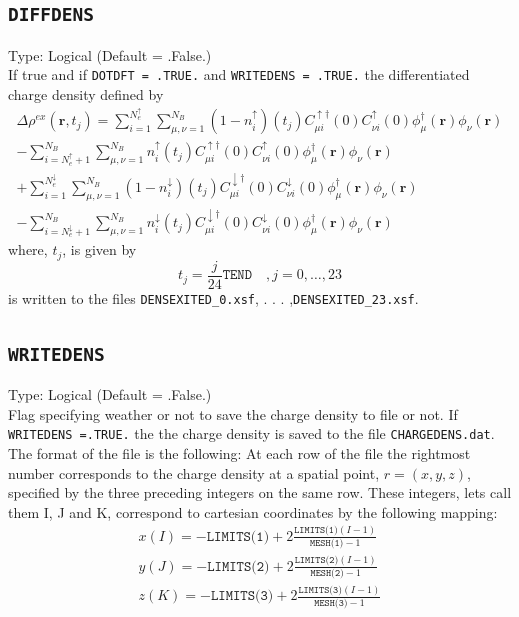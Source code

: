\documentclass[a4paper,twoside,openany]{book}
\begin{document}
{{{{\subsection{\texttt{DIFFDENS}}
Type: Logical (Default = .False.)\\
If true and if \texttt{DOTDFT = .TRUE.} and \texttt{WRITEDENS = .TRUE.}  the differentiated charge density defined by 
\begin{eqnarray}
\Delta \rho^{ex}(\mathbf{r},t_{j}) = \sum_{i=1}^{N_{e}^{\uparrow}}\sum_{\mu,\nu=1}^{N_{B}}(1-n^{\uparrow}_{i})(t_{j})C_{\mu i}^{\uparrow \dagger}(0)C_{\nu i}^{\uparrow}(0)\phi_{\mu}^{\dagger}(\mathbf{r})\phi_{\nu}(\mathbf{r})   \nonumber \\
-\sum_{i=N_{e}^{\uparrow}+1}^{N_{B}}\sum_{\mu,\nu=1}^{N_{B}}n^{\uparrow}_{i}(t_{j})C_{\mu i}^{\uparrow \dagger}(0)C_{\nu i}^{\uparrow}(0)\phi_{\mu}^{\dagger}(\mathbf{r})\phi_{\nu}(\mathbf{r})   \nonumber \\
+\sum_{i=1}^{N_{e}^{\downarrow}}\sum_{\mu,\nu=1}^{N_{B}}(1-n^{\downarrow}_{i})(t_{j})C_{\mu i}^{\downarrow \dagger}(0)C_{\nu i}^{\downarrow}(0)\phi_{\mu}^{\dagger}(\mathbf{r})\phi_{\nu}(\mathbf{r})  \nonumber \\
-\sum_{i=N_{e}^{\downarrow}+1}^{N_{B}}\sum_{\mu,\nu=1}^{N_{B}}n^{\downarrow}_{i}(t_{j})C_{\mu i}^{\downarrow \dagger}(0)C_{\nu i}^{\downarrow}(0)\phi_{\mu}^{\dagger}(\mathbf{r})\phi_{\nu}(\mathbf{r})
\end{eqnarray}
where, $t_{j}$, is given by
\begin{equation}
t_{j} = \frac{j}{24}\texttt{TEND}\quad,j=0,\ldots, 23 
\end{equation}
is written to the files \texttt{DENSEXITED\_0.xsf}, . . . ,\texttt{DENSEXITED\_23.xsf}.

\subsection{\texttt{WRITEDENS}}
Type: Logical (Default = .False.)\\
Flag specifying weather or not to save the charge density to file or not. If \texttt{WRITEDENS =.TRUE.} the the charge density is saved to the file \texttt{CHARGEDENS.dat}. The format of the 
file is the following:  At each row of the file the rightmost number corresponds to the charge density at a spatial point, $r=(x,y,z)$,  specified by the three preceding integers on the same row. These integers,  
lets call them I, J and K, correspond to cartesian coordinates by the following mapping:
\begin{eqnarray}
x(I) = - \texttt{LIMITS(1)}+2\frac{\texttt{LIMITS(1)}(I-1)}{\texttt{MESH(1)}-1} \nonumber \\
y(J) = - \texttt{LIMITS(2)}+2\frac{\texttt{LIMITS(2)}(I-1)}{\texttt{MESH(2)}-1} \nonumber \\
z(K) = - \texttt{LIMITS(3)}+2\frac{\texttt{LIMITS(3)}(I-1)}{\texttt{MESH(3)}-1} \nonumber 
\end{eqnarray}

}}}}
\end{document}
